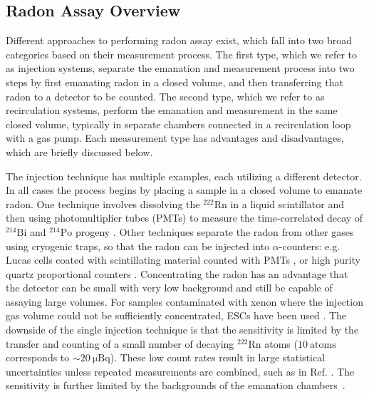 \documentclass[final,3p,times]{elsarticle}
\begin{document}
\subsection{Radon Assay Overview}
Different approaches to performing radon assay exist, which fall into two broad categories based on their measurement process.
The first type, which we refer to as injection systems, separate the emanation and measurement process into two steps by first emanating radon in a closed volume, and then transferring that radon to a detector to be counted.
The second type, which we refer to as recirculation systems, perform the emanation and measurement in the same closed volume, typically in separate chambers connected in a recirculation loop with a gas pump. 
Each measurement type has advantages and disadvantages, which are briefly discussed below. 

The injection technique has multiple examples, each utilizing a different detector. 
In all cases the process begins by placing a sample in a closed volume to emanate radon.
One technique involves dissolving the $^{222}\text{Rn}$ in a liquid scintillator and then using photomultiplier tubes (PMTs) to measure the time-correlated decay of $^{214}\text{Bi}$ and $^{214}\text{Po}$ progeny \cite{sazzad24_rn}. 
Other techniques separate the radon from other gases using cryogenic traps, so that the radon can be injected into $\alpha$-counters:
e.g. Lucas cells coated with scintillating material counted with PMTs \cite{Liu1993, LucasCell_Blevis2004}, or high purity quartz proportional counters \cite{Zuzel2009,RnAssays_XENON1T}.
Concentrating the radon has an advantage that the detector can be small with very low background and still be capable of assaying large volumes.
For samples contaminated with xenon where the injection gas volume could not be sufficiently concentrated, ESCs have been used \cite{brunner_thesis,RnAssays_XENON1T}. 
The downside of the single injection technique is that the sensitivity is limited by the transfer and counting of a small number of decaying $^{222}\text{Rn}$ atoms ($10~\text{atoms}$ corresponds to $\sim 20~\mathrm{\mu Bq}$).
These low count rates result in large statistical uncertainties unless repeated measurements are combined, such as in Ref. \cite{Armstrong2023}. 
The sensitivity is further limited by the backgrounds of the emanation chambers~\cite{Zuzel2009}.
\end{document}
